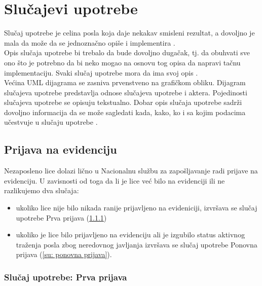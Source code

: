 \section{Slu\v cajevi upotrebe}

Slu\v caj upotrebe je celina posla koja daje nekakav smisleni rezultat, a dovoljno je mala da mo\v ze da se jednozna\v cno opi\v se i implementira \cite{smalkov-slajdovi}.\\

Opis slu\v caja upotrebe bi trebalo da bude dovoljno duga\v cak, tj. da obuhvati sve ono \v sto je potrebno da bi neko mogao na osnovu tog opisa da napravi ta\v cnu implementaciju. Svaki slu\v caj upotrebe mora da ima svoj opis \cite{smalkov-slajdovi}.\\

Ve\' cina UML dijagrama se zasniva prvenstveno na grafi\v ckom obliku. Dijagram slu\v cajeva upotrebe predstavlja odnose slu\v cajeva upotrebe i aktera. Pojedinosti slu\v cajeva upotrebe se opisuju tekstualno. Dobar opis slu\v caja upotrebe sadr\v zi dovoljno informacija da se mo\v ze sagledati kada, kako, ko i sa kojim podacima u\v cestvuje u slu\v caju upotrebe \cite{smalkov-slajdovi}.

\subsection{Prijava na evidenciju}

Nezaposleno lice dolazi li\v cno u Nacionalnu slu\v zbu za zapo\v sljavanje radi prijave na evidenciju. U zavisnosti od toga da li je lice ve\' c bilo na evidenciji ili ne razlikujemo dva slu\v caja:

\begin{itemize}
	\item ukoliko lice nije bilo nikada ranije prijavljeno na evideniciji, izvr\v sava se slu\v caj upotrebe Prva prijava (\ref{su: prva prijava})
	\item ukoliko je lice bilo prijavljeno na evidenciju ali je izgubilo status aktivnog tra\v zenja posla zbog neredovnog javljanja izvr\v sava se slu\v caj upotrebe Ponovna prijava (\ref{su: ponovna prijava}).
\end{itemize}


\subsubsection{Slu\v caj upotrebe: Prva prijava}
\label{su: prva prijava}

